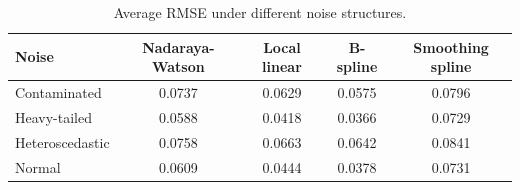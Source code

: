 \begin{table}[H]
\centering
\caption{Average RMSE under different noise structures.}
\label{tab:noise-comparison}
\small
\begin{tabular}{lcccc}
\toprule
Noise & Nadaraya-Watson & Local linear & B-spline & Smoothing spline \\
\midrule
Contaminated & 0.0737 & 0.0629 & 0.0575 & 0.0796 \\
Heavy-tailed & 0.0588 & 0.0418 & 0.0366 & 0.0729 \\
Heteroscedastic & 0.0758 & 0.0663 & 0.0642 & 0.0841 \\
Normal & 0.0609 & 0.0444 & 0.0378 & 0.0731 \\
\bottomrule
\end{tabular}
\end{table}
